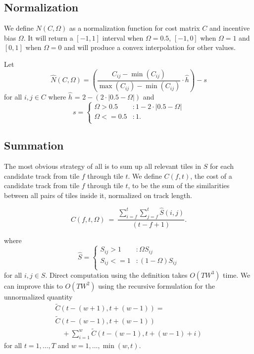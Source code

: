 \documentclass[twocolumn]{article}
\begin{document}
	\subsection{Normalization}
	
	We define $N(C,\Omega)$ as a normalization function for cost matrix $C$ and incentive bias $\Omega$. It will return a $[-1,1]$ interval when $\Omega=0.5$, $[-1,0]$ when $\Omega=1$  and $[0, 1]$ when $\Omega=0$ and will produce a convex interpolation for other values.
	
	Let 
	\begin{dmath*}
		\hat N(C,\Omega) = \left( \frac{ C_{ij} - \min \left( C_{ij} \right) }{ \max \left( C_{ij} \right) - \min \left( C_{ij} \right) } \cdot \hat h  \right)-s
	\end{dmath*}
	for all $i,j \in C$ where $\hat h$ = $2-\left( 2\cdot|0.5-\Omega| \right)$ and 
	\begin{dmath*}
		s= { \left\{
			\begin{array}{ll}
				\Omega > 0.5  & :   1-2 \cdot |0.5-\Omega|  \\
				\Omega <= 0.5 & : 1.  \\
			\end{array}
			\right.}
	\end{dmath*}
	
	\subsection{Summation}
	
	The most obvious strategy of all is to sum up all relevant tiles in $S$ for each candidate track from tile $f$ through tile $t$. We define $C(f,t)$, the cost of a candidate track from tile $f$ through tile $t$, to be the sum of the similarities between all pairs of tiles inside it, normalized on track length.
	
	\begin{dmath*}
		C(f,t, \Omega) ~=~ \frac{ \sum_{i=f}^{t} \sum_{j=f}^{t} \hat S(i,j) }{ (t-f+1) }.
	\end{dmath*}
	
	where
	\begin{dmath*}
		\hat S=	{ \left\{
			\begin{array}{ll}
				S_{ij} > 1  & :  \Omega S_{ij}   \\
				S_{ij} <= 1 & :  \left( 1-\Omega \right) S_{ij} \\
			\end{array}
			\right.} 
	\end{dmath*} for all $i,j \in S.$ Direct computation using the definition takes $O(TW^3)$ time. We can improve this to $O(TW^2)$ using the recursive formulation for the unnormalized quantity 
	\begin{dmath*} 
		\begin{array}{ll}
		\tilde C( t-(w+1),t+(w-1) ) = \\
		 \tilde C( t-(w-1),t+(w-1) ) \\
		\hspace{1em} +  \sum_{i=1}^{w} \tilde C(t-(w-1),t+(w-1)+i)
		\end{array}
	\end{dmath*} for all $t=1,\ldots, T$ and $w=1,\ldots,\min(w,t)$.
	
\end{document}
